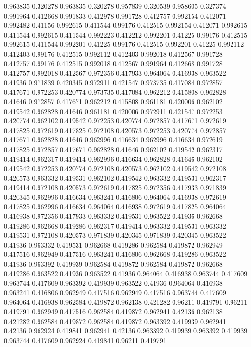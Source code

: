 0.963835 0.320278
0.963835 0.320278
0.957839 0.320539
0.958605 0.327374
0.991964 0.412668
0.991833 0.412978
0.991728 0.412757
0.992154 0.412071
0.992482 0.41156
0.992615 0.411544
0.99176 0.412515
0.992154 0.412071
0.992615 0.411544
0.992615 0.411544
0.992223 0.412212
0.992201 0.41225
0.99176 0.412515
0.992615 0.411544
0.992201 0.41225
0.99176 0.412515
0.992201 0.41225
0.992112 0.412403
0.99176 0.412515
0.992112 0.412403
0.992018 0.412567
0.991728 0.412757
0.99176 0.412515
0.992018 0.412567
0.991964 0.412668
0.991728 0.412757
0.992018 0.412567
0.972356 0.417933
0.964064 0.416938
0.963522 0.41936
0.971839 0.420345
0.972911 0.421547
0.973735 0.417084
0.972857 0.417671
0.972253 0.420774
0.973735 0.417084
0.962212 0.415808
0.962828 0.41646
0.972857 0.417671
0.962212 0.415808
0.961181 0.420006
0.962102 0.419542
0.962828 0.41646
0.961181 0.420006
0.972911 0.421547
0.972253 0.420774
0.962102 0.419542
0.972253 0.420774
0.972857 0.417671
0.972619 0.417825
0.972619 0.417825
0.972108 0.420573
0.972253 0.420774
0.972857 0.417671
0.962828 0.41646
0.962996 0.416634
0.962996 0.416634
0.972619 0.417825
0.972857 0.417671
0.962828 0.41646
0.962102 0.419542
0.962317 0.419414
0.962317 0.419414
0.962996 0.416634
0.962828 0.41646
0.962102 0.419542
0.972253 0.420774
0.972108 0.420573
0.962102 0.419542
0.972108 0.420573
0.963332 0.419531
0.962102 0.419542
0.963332 0.419531
0.962317 0.419414
0.972108 0.420573
0.972619 0.417825
0.972356 0.417933
0.971839 0.420345
0.962996 0.416634
0.963241 0.416806
0.964064 0.416938
0.972619 0.417825
0.962996 0.416634
0.964064 0.416938
0.972619 0.417825
0.964064 0.416938
0.972356 0.417933
0.963332 0.419531
0.963522 0.41936
0.962668 0.419286
0.962668 0.419286
0.962317 0.419414
0.963332 0.419531
0.963332 0.419531
0.972108 0.420573
0.971839 0.420345
0.971839 0.420345
0.963522 0.41936
0.963332 0.419531
0.962668 0.419286
0.962584 0.419872
0.962949 0.417516
0.962949 0.417516
0.963241 0.416806
0.962668 0.419286
0.963522 0.41936
0.963392 0.419939
0.962584 0.419872
0.962584 0.419872
0.962668 0.419286
0.963522 0.41936
0.963522 0.41936
0.964064 0.416938
0.963744 0.417609
0.963744 0.417609
0.963392 0.419939
0.963522 0.41936
0.964064 0.416938
0.963241 0.416806
0.962949 0.417516
0.962949 0.417516
0.963744 0.417609
0.964064 0.416938
0.962584 0.419872
0.962138 0.421282
0.96211 0.419791
0.96211 0.419791
0.962949 0.417516
0.962584 0.419872
0.962941 0.42136
0.962138 0.421282
0.962584 0.419872
0.962584 0.419872
0.963392 0.419939
0.962941 0.42136
0.962924 0.419841
0.962941 0.42136
0.963392 0.419939
0.963392 0.419939
0.963744 0.417609
0.962924 0.419841
0.96211 0.419791
